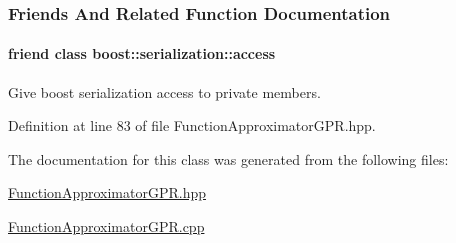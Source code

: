\subsubsection{Friends And Related Function Documentation}
\hypertarget{classDmpBbo_1_1FunctionApproximatorGPR_ac98d07dd8f7b70e16ccb9a01abf56b9c}{
\paragraph[{boost\+::serialization\+::access}]{\setlength{\rightskip}{0pt plus 5cm}friend class boost\+::serialization\+::access\hspace{0.3cm}{\ttfamily [friend]}}}\label{classDmpBbo_1_1FunctionApproximatorGPR_ac98d07dd8f7b70e16ccb9a01abf56b9c}


Give boost serialization access to private members. 



Definition at line 83 of file Function\+Approximator\+G\+P\+R.\+hpp.



The documentation for this class was generated from the following files\+:\begin{DoxyCompactItemize}
\item 
\hyperlink{FunctionApproximatorGPR_8hpp}{Function\+Approximator\+G\+P\+R.\+hpp}\item 
\hyperlink{FunctionApproximatorGPR_8cpp}{Function\+Approximator\+G\+P\+R.\+cpp}\end{DoxyCompactItemize}

